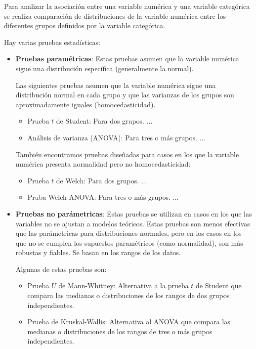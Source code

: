 \begin{tcolorbox}
    [colback=gray!5!white, colframe=gray!60!black, title=Medida de asociación]

    Para analizar la asociación entre una variable numérica y una variable categórica se realiza comparación de distribuciones de la variable numérica entre los diferentes grupos definidos por la variable categórica.

    Hay varias pruebas estadísticas:
    \begin{itemize}
        \item \textbf{Pruebas paramétricas}: Estas pruebas asumen que la variable numérica sigue una distribución específica (generalmente la normal).
        
        Las siguientes pruebas asumen que la variable numérica sigue una distribución normal en cada grupo y que las varianzas de los grupos son aproximadamente iguales (homocedasticidad).

        \begin{itemize}
            \item Prueba $t$ de Student: Para dos grupos. ...
            \item Análisis de varianza (ANOVA): Para tres o más grupos. ...
        \end{itemize}

        También encontramos pruebas diseñadas para casos en los que la variable numérica presenta normalidad pero no homocedasticidad:

        \begin{itemize}
            \item Prueba $t$ de Welch: Para dos grupos. ...
            \item Pruba Welch ANOVA: Para tres o más grupos. ...
        \end{itemize}
        
        \item \textbf{Pruebas no parámetricas}: Estas pruebas se utilizan en casos en los que las variables no se ajustan a modelos teóricos. Estas pruebas son menos efectivas que las parámetricas para distribuciones normales, pero en los casos en los que no se cumplen los supuestos paramétricos (como normalidad), son más robustas y fiables. Se basan en los rangos de los datos.
        
        Algunas de estas pruebas son:
        
        \begin{itemize}
            \item Prueba $U$ de Mann-Whitney: Alternativa a la prueba $t$ de Student que compara las medianas o distribuciones de los rangos de dos grupos independientes.
            \item Prueba de Kruskal-Wallis: Alternativa al ANOVA que compara las medianas o distribuciones de los rangos de tres o más grupos independientes.
        \end{itemize}
        

\end{itemize}
\end{tcolorbox}
